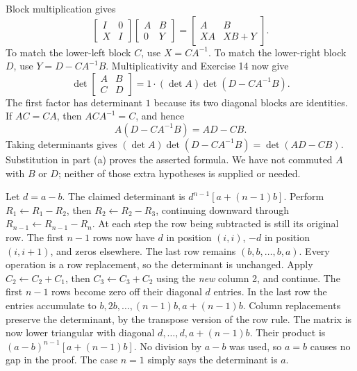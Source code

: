 Block multiplication gives
\[
\begin{bmatrix}I&0\\X&I\end{bmatrix}
\begin{bmatrix}A&B\\0&Y\end{bmatrix}
=\begin{bmatrix}A&B\\XA&XB+Y\end{bmatrix}.
\]
To match the lower-left block $C$, use $X=CA^{-1}$. To match the lower-right block $D$, use $Y=D-CA^{-1}B$. Multiplicativity and Exercise 14 now give
\[
\det\begin{bmatrix}A&B\\C&D\end{bmatrix}
=1\cdot(\det A)\det(D-CA^{-1}B).
\]
The first factor has determinant $1$ because its two diagonal blocks are identities.
If $AC=CA$, then $ACA^{-1}=C$, and hence
\[
A(D-CA^{-1}B)=AD-CB.
\]
Taking determinants gives $(\det A)\det(D-CA^{-1}B)=\det(AD-CB)$. Substitution in part (a) proves the asserted formula. We have not commuted $A$ with $B$ or $D$; neither of those extra hypotheses is supplied or needed.

Let $d=a-b$. The claimed determinant is $d^{n-1}[a+(n-1)b]$.
Perform $R_1\leftarrow R_1-R_2$, then $R_2\leftarrow R_2-R_3$, continuing downward through $R_{n-1}\leftarrow R_{n-1}-R_n$. At each step the row being subtracted is still its original row. The first $n-1$ rows now have $d$ in position $(i,i)$, $-d$ in position $(i,i+1)$, and zeros elsewhere. The last row remains $(b,b,\ldots,b,a)$. Every operation is a row replacement, so the determinant is unchanged.
Apply $C_2\leftarrow C_2+C_1$, then $C_3\leftarrow C_3+C_2$ using the \emph{new} column 2, and continue. The first $n-1$ rows become zero off their diagonal $d$ entries. In the last row the entries accumulate to $b,2b,\ldots,(n-1)b,a+(n-1)b$. Column replacements preserve the determinant, by the transpose version of the row rule.
The matrix is now lower triangular with diagonal $d,\ldots,d,a+(n-1)b$. Their product is $(a-b)^{n-1}[a+(n-1)b]$. No division by $a-b$ was used, so $a=b$ causes no gap in the proof. The case $n=1$ simply says the determinant is $a$.

